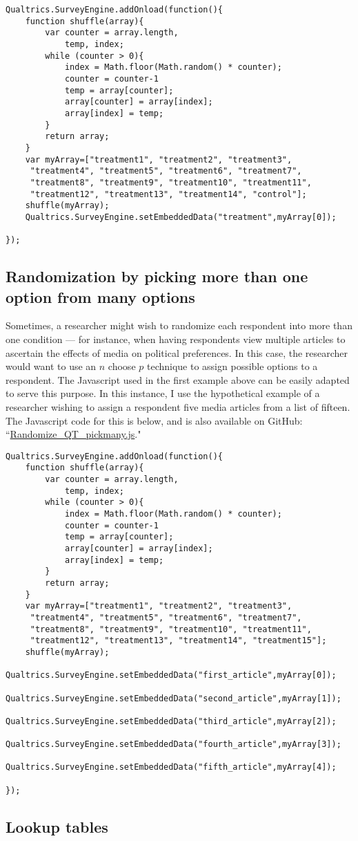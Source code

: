 \documentclass[12pt]{article}
\begin{document}
\begin{verbatim}
Qualtrics.SurveyEngine.addOnload(function(){
	function shuffle(array){
		var counter = array.length,
			temp, index;
		while (counter > 0){
			index = Math.floor(Math.random() * counter);
			counter = counter-1
			temp = array[counter];
			array[counter] = array[index];
			array[index] = temp;
		}
		return array;
	}
	var myArray=["treatment1", "treatment2", "treatment3",
	 "treatment4", "treatment5", "treatment6", "treatment7", 
	 "treatment8", "treatment9", "treatment10", "treatment11", 
	 "treatment12", "treatment13", "treatment14", "control"];
	shuffle(myArray);
	Qualtrics.SurveyEngine.setEmbeddedData("treatment",myArray[0]);

});
\end{verbatim}

\subsection{Randomization by picking more than one option from many options}
Sometimes, a researcher might wish to randomize each respondent into more than one condition --- for instance, when having respondents view multiple articles to ascertain the effects of media on political preferences. In this case, the researcher would want to use an $n$ choose $p$ technique to assign possible options to a respondent. The Javascript used in the first example above can be easily adapted to serve this purpose. In this instance, I use the hypothetical example of a researcher wishing to assign a respondent five media articles from a list of fifteen. The Javascript code for this is below, and is also available on GitHub: ``\href{https://github.com/justindbk/qualtrics-javascript}{Randomize\_QT\_pickmany.js}."

\begin{verbatim}
Qualtrics.SurveyEngine.addOnload(function(){
	function shuffle(array){
		var counter = array.length,
			temp, index;
		while (counter > 0){
			index = Math.floor(Math.random() * counter);
			counter = counter-1
			temp = array[counter];
			array[counter] = array[index];
			array[index] = temp;
		}
		return array;
	}
	var myArray=["treatment1", "treatment2", "treatment3",
	 "treatment4", "treatment5", "treatment6", "treatment7", 
	 "treatment8", "treatment9", "treatment10", "treatment11", 
	 "treatment12", "treatment13", "treatment14", "treatment15"];
	shuffle(myArray);
	Qualtrics.SurveyEngine.setEmbeddedData("first_article",myArray[0]);
	Qualtrics.SurveyEngine.setEmbeddedData("second_article",myArray[1]);
	Qualtrics.SurveyEngine.setEmbeddedData("third_article",myArray[2]);
	Qualtrics.SurveyEngine.setEmbeddedData("fourth_article",myArray[3]);
	Qualtrics.SurveyEngine.setEmbeddedData("fifth_article",myArray[4]);

});
\end{verbatim}

\subsection{Lookup tables}



\end{document}
